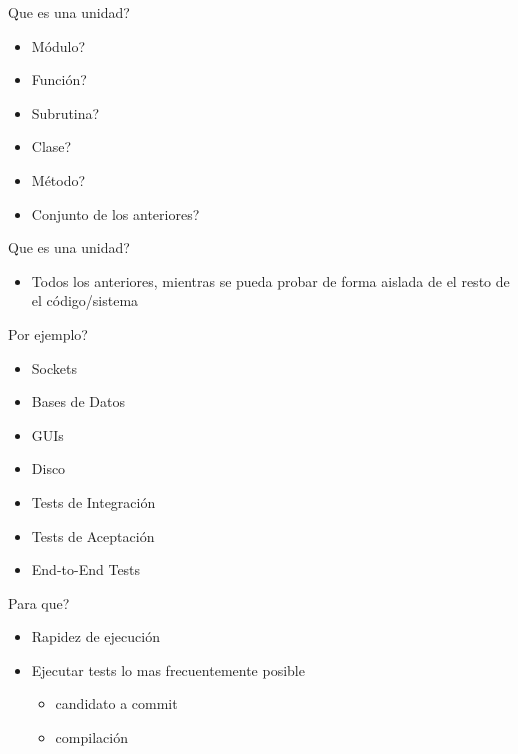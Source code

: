 
\begin{frame}{Que es una unidad?}
    \begin{itemize}
        \item Módulo?
        \item Función?
        \item Subrutina?
        \item Clase?
        \item Método?
        \item Conjunto de los anteriores?
    \end{itemize}
\end{frame}

\begin{frame}{Que es una unidad?}
    \begin{itemize}
        \item Todos los anteriores, mientras se pueda probar de forma aislada de el resto de el código/sistema
    \end{itemize}
\end{frame}

\begin{frame}{Por ejemplo?}
    \begin{itemize}
        \item Sockets
        \item Bases de Datos
        \item GUIs
        \item Disco
    \end{itemize}

    \begin{itemize}
        \item Tests de Integración
        \item Tests de Aceptación
        \item End-to-End Tests
    \end{itemize}
\end{frame}

\begin{frame}{Para que?}
    \begin{itemize}
        \item Rapidez de ejecución
        \item Ejecutar tests lo mas frecuentemente posible
        \begin{itemize}
            \item candidato a commit
            \item compilación
        \end{itemize}
    \end{itemize}
\end{frame}

